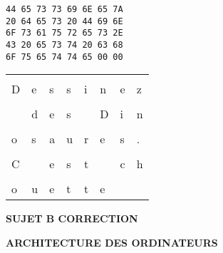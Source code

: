 \documentclass[11pt,a4paper]{article}
\newcommand{\TitreMatiere}{Architecture des Ordinateurs}
\begin{document}

\begin{table}[ht!]
  \centering
  \begin{minipage}{0.4\textwidth}
    \centering
\begin{lstlisting}[style=algorithmique]
44 65 73 73 69 6E 65 7A
20 64 65 73 20 44 69 6E
6F 73 61 75 72 65 73 2E
43 20 65 73 74 20 63 68
6F 75 65 74 74 65 00 00
\end{lstlisting}
  \end{minipage}
  \hfillx
  \begin{minipage}{0.45\textwidth}
    \centering

\begin{tabular}{ | m{0.45cm} | m{0.45cm} | m{0.45cm} | m{0.45cm}   |   m{0.45cm} | m{0.45cm} | m{0.45cm} | m{0.45cm} | }
\hline
   &   &   &   &   &   &   &   \\
 D & e & s & s & i & n & e & z \\
\hline
   &   &   &   &   &   &   &   \\
   & d & e & s &   & D & i & n \\
\hline
   &   &   &   &   &   &   &   \\
 o & s & a & u & r & e & s & . \\
\hline
   &   &   &   &   &   &   &   \\
 C &   & e & s & t &   & c & h \\
\hline
   &   &   &   &   &   &   &   \\
 o & u & e & t & t & e &   &   \\
\hline
\end{tabular}

  \end{minipage}
\end{table}


%
%

\newpage



\vfillFirst

\begin{center}

\begin{LARGE}
\textbf{SUJET B CORRECTION}

\bigskip

\textbf{\MakeUppercase{\TitreMatiere}}
\end{LARGE}

\end{center}

\vfillLast
\end{document}
